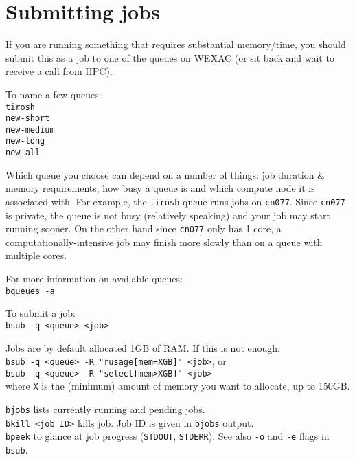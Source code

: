 \documentclass[]{book}
\begin{document}
\section{Submitting jobs}\label{submitting-jobs}

If you are running something that requires substantial memory/time, you
should submit this as a job to one of the queues on WEXAC (or sit back
and wait to receive a call from HPC).

To name a few queues:\\
\texttt{tirosh}\\
\texttt{new-short}\\
\texttt{new-medium}\\
\texttt{new-long}\\
\texttt{new-all}

Which queue you choose can depend on a number of things: job duration \&
memory requirements, how busy a queue is and which compute node it is
associated with. For example, the \texttt{tirosh} queue runs jobs on
\texttt{cn077}. Since \texttt{cn077} is private, the queue is not busy
(relatively speaking) and your job may start running sooner. On the
other hand since \texttt{cn077} only has 1 core, a
computationally-intensive job may finish more slowly than on a queue
with multiple cores.

For more information on available queues:\\
\texttt{bqueues\ -a}

To submit a job:\\
\texttt{bsub\ -q\ \textless{}queue\textgreater{}\ \textless{}job\textgreater{}}

Jobs are by default allocated 1GB of RAM. If this is not enough:\\
\texttt{bsub\ -q\ \textless{}queue\textgreater{}\ -R\ "rusage{[}mem=XGB{]}"\ \textless{}job\textgreater{}},
or\\
\texttt{bsub\ -q\ \textless{}queue\textgreater{}\ -R\ "select{[}mem\textgreater{}XGB{]}"\ \textless{}job\textgreater{}}\\
where \texttt{X} is the (minimum) amount of memory you want to allocate,
up to 150GB.

\texttt{bjobs} lists currently running and pending jobs.\\
\texttt{bkill\ \textless{}job\ ID\textgreater{}} kills job. Job ID is
given in \texttt{bjobs} output.\\
\texttt{bpeek} to glance at job progress (\texttt{STDOUT},
\texttt{STDERR}). See also \texttt{-o} and \texttt{-e} flags in
\texttt{bsub}.


\end{document}
